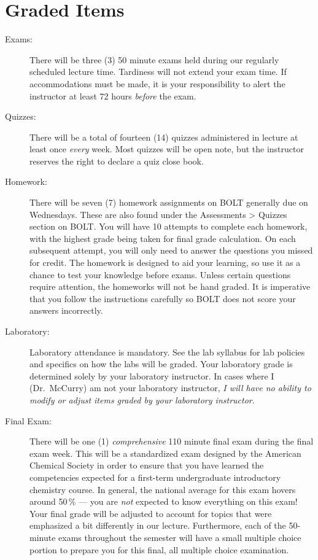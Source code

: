 \documentclass[11pt,letterpaper]{article}
\begin{document}
\section{Graded Items}
\begin{description}
	\item[Exams:] There will be three (3) 50 minute exams held during our
		regularly scheduled lecture time. Tardiness will not extend your
		exam time. If accommodations must be made, it is your
		responsibility to alert the instructor at least 72 hours
		\emph{before} the exam.
	\item[Quizzes:] There will be a total of fourteen (14) quizzes
		administered in lecture at least once \emph{every} week. Most
		quizzes will be open note, but the instructor reserves the right
		to declare a quiz close book.
	\item[Homework:] There will be seven (7) homework assignments on BOLT
		generally due on Wednesdays. These are also found under the
		Assessments > Quizzes section on BOLT. You will have 10 attempts
		to complete each homework, with the highest grade being taken
		for final grade calculation. On each subsequent attempt, you
		will only need to answer the questions you missed for credit.
		The homework is designed to aid your learning, so use it as a
		chance to test your knowledge before exams. Unless certain
		questions require attention, the homeworks will not be hand
		graded. It is imperative that you follow the instructions
		carefully so BOLT does not score your answers incorrectly.
	\item[Laboratory:] Laboratory attendance is mandatory. See the lab
		syllabus for lab policies and specifics on how the labs will be
		graded. Your laboratory grade is determined solely by your
		laboratory instructor. In cases where I (Dr.\ McCurry) am not
		your laboratory instructor, \emph{I will have no ability to
		modify or adjust items graded by your laboratory instructor}.
	\item[Final Exam:] There will be one (1) \emph{comprehensive} 110 minute
		final exam during the final exam week. This will be a
		standardized exam designed by the American Chemical Society in
		order to ensure that you have learned the competencies expected
		for a first-term undergraduate introductory chemistry course. In
		general, the national average for this exam hovers around
		50\,\% --- you are \emph{not} expected to know everything on
		this exam! Your final grade will be adjusted to account for
		topics that were emphasized a bit differently in our lecture.
		Furthermore, each of the 50-minute exams throughout the semester
		will have a small multiple choice portion to prepare you for
		this final, all multiple choice examination.
\end{description}
\end{document}
